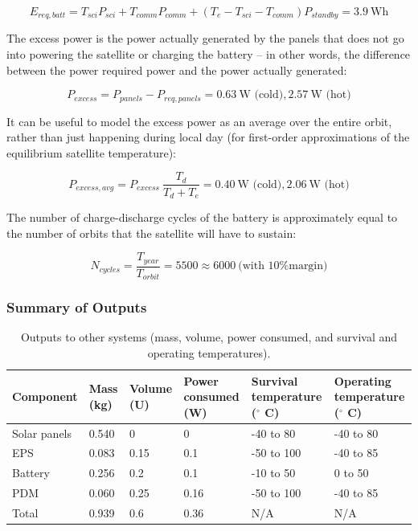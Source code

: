 \documentclass[12pt]{article}
\begin{document}
\begin{equation}
E_{req,batt} = T_{sci} P_{sci} + T_{comm} P_{comm} + (T_e - T_{sci} - T_{comm}) P_{standby} = 3.9 \ \text{Wh}
\label{eq:power-batt-req}
\end{equation}

The excess power is the power actually generated by the panels that does not go into powering the satellite or charging the battery -- in other words, the difference between the power required power and the power actually generated:

\begin{equation}
P_{excess} = P_{panels} - P_{req,panels} = 0.63 \ \text{W (cold)}, 2.57 \ \text{W (hot)}
\label{eq:power-excess}
\end{equation}

It can be useful to model the excess power as an average over the entire orbit, rather than just happening during local day (for first-order approximations of the equilibrium satellite temperature):

\begin{equation}
P_{excess,avg} = P_{excess} \: \frac{T_d}{T_d + T_e} = 0.40 \ \text{W (cold)}, 2.06 \ \text{W (hot)}
\label{eq:power-excess-avg}
\end{equation}

The number of charge-discharge cycles of the battery is approximately equal to the number of orbits that the satellite will have to sustain:

\begin{equation}
N_{cycles} = \frac{T_{year}}{T_{orbit}} = 5500 \approx 6000 \ \text{(with 10\% margin)}
\label{eq:power-num-cycles}
\end{equation}

			\subsubsection{Summary of Outputs}

\begin{table}[ht]\label{table:power-outputs}
\caption{Outputs to other systems (mass, volume, power consumed, and survival and operating temperatures).\cite{EPS manual} \cite{PDM manual} \cite{Battery manual} \cite{Solar panel datasheet}}
\begin{center}
    \begin{tabular}{|l|l|l|p{0.8in}|p{1in}|p{1.1in}|} \hline
Component & Mass (kg) & Volume (U) & Power consumed (W) & Survival temperature ($^\circ$ C) & Operating temperature ($^\circ$ C) \\ \hline \hline
Solar panels & 0.540 & 0 & 0 & -40 to 80 & -40 to 80 \\\hline
EPS & 0.083 & 0.15 & 0.1 & -50 to 100 & -40 to 85 \\\hline
Battery & 0.256 & 0.2 & 0.1 & -10 to 50 & 0 to 50 \\\hline
PDM & 0.060 & 0.25 & 0.16 & -50 to 100 & -40 to 85 \\\hline \hline
Total & 0.939 & 0.6 & 0.36 & N/A & N/A \\\hline
    \end{tabular}
\end{center}
\end{table}
\end{document}
